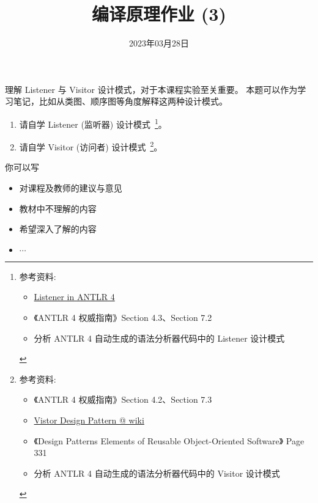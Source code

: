 \documentclass[a4paper, justified]{tufte-handout}
\title{编译原理作业 (3)}
\date{2023年03月28日}
\begin{document}
\maketitle
\noplagiarism %
\begin{abstract}
\end{abstract}
\beginrequired

\begin{problem}[设计模式]
  理解 Listener 与 Visitor 设计模式，对于本课程实验至关重要。
  本题可以作为学习笔记，比如从类图、顺序图等角度解释这两种设计模式。
  \begin{enumerate}[(1)]
    \item 请自学 Listener (监听器) 设计模式~\footnote{参考资料:
      \begin{itemize}
        \item \href{https://github.com/antlr/antlr4/blob/master/doc/listeners.md}{Listener in ANTLR 4}
        \item 《ANTLR 4 权威指南》Section 4.3、Section 7.2
        \item 分析 ANTLR 4 自动生成的语法分析器代码中的 Listener 设计模式
      \end{itemize}
    }。
    \item 请自学 Visitor (访问者) 设计模式~\footnote{参考资料:
      \begin{itemize}
        \item 《ANTLR 4 权威指南》Section 4.2、Section 7.3
        \item \href{https://en.wikipedia.org/wiki/Visitor_pattern}{Vistor Design Pattern @ wiki}
        \item 《Design Patterns Elements of Reusable Object-Oriented Software》 Page 331
        \item 分析 ANTLR 4 自动生成的语法分析器代码中的 Visitor 设计模式
      \end{itemize}
    }。
  \end{enumerate}
\end{problem}

\begin{solution}
\end{solution}



\beginfb

你可以写
\begin{itemize}
  \item 对课程及教师的建议与意见
  \item 教材中不理解的内容
  \item 希望深入了解的内容
  \item $\cdots$
\end{itemize}
\end{document}
